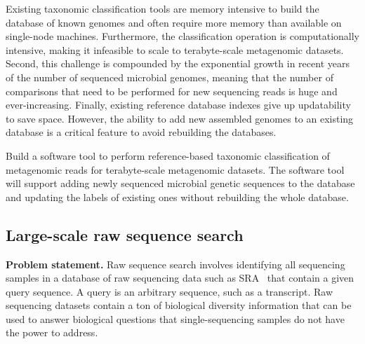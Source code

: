 Existing taxonomic classification tools are memory intensive to build the database of known genomes and often require more memory than available on single-node machines. Furthermore, the classification operation is computationally intensive, making it infeasible to scale to terabyte-scale metagenomic datasets.
Second, this challenge is compounded by the exponential growth in recent years of the number of sequenced microbial genomes, meaning that the number of comparisons that need to be performed for new sequencing reads is huge and ever-increasing.
%
Finally, existing reference database indexes give up updatability to save space. However, the ability to add new assembled genomes to an existing database is a critical feature to avoid rebuilding the databases.


\begin{rproblem}
Build a software tool to perform reference-based taxonomic classification of metagenomic reads for terabyte-scale metagenomic datasets. The software tool will support adding newly sequenced microbial genetic sequences to the database and updating the labels of existing ones without rebuilding the whole database.
\label{rprob:taxo-meta}
\end{rproblem}



\subsection{Large-scale raw sequence search}

\textbf{Problem statement.} Raw sequence search involves identifying all sequencing samples in a database of raw sequencing data such as SRA~\cite{kodama2012sequence,KatzSLKBO22} that contain a given query sequence. A query is an arbitrary sequence, such as a transcript. Raw sequencing datasets contain a ton of biological diversity information that can be used to answer biological questions that single-sequencing samples do not have the power to address.

